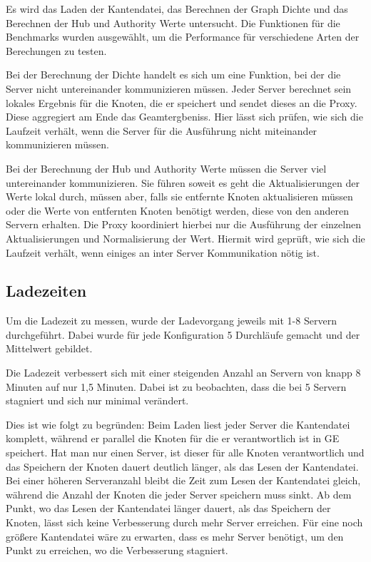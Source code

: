 Es wird das Laden der Kantendatei, das Berechnen der Graph Dichte und das Berechnen der Hub und Authority Werte untersucht. Die Funktionen für die Benchmarks wurden ausgewählt, um die Performance für verschiedene Arten der Berechungen zu testen.

Bei der Berechnung der Dichte handelt es sich um eine Funktion, bei der die Server nicht untereinander kommunizieren müssen. Jeder Server berechnet sein lokales Ergebnis für die Knoten, die er speichert und sendet dieses an die Proxy. 
Diese aggregiert am Ende das Geamtergbeniss. Hier lässt sich prüfen, wie sich die Laufzeit verhält, wenn die Server für die Ausführung nicht miteinander kommunizieren müssen.

Bei der Berechnung der Hub und Authority Werte müssen die Server viel untereinander kommunizieren. Sie führen soweit es geht die Aktualisierungen der Werte lokal durch, müssen aber, falls sie entfernte Knoten aktualisieren müssen oder die Werte von entfernten Knoten benötigt werden, diese von den anderen Servern erhalten.
Die Proxy koordiniert hierbei nur die Ausführung der einzelnen Aktualisierungen und Normalisierung der Wert. Hiermit wird geprüft, wie sich die Laufzeit verhält, wenn einiges an inter Server Kommunikation nötig ist.


\subsection{Ladezeiten}

Um die Ladezeit zu messen, wurde der Ladevorgang jeweils mit 1-8 Servern durchgeführt. Dabei wurde für jede Konfiguration 5 Durchläufe gemacht und der Mittelwert gebildet.

Die Ladezeit verbessert sich mit einer steigenden Anzahl an Servern von knapp 8 Minuten auf nur 1,5 Minuten. Dabei ist zu beobachten, dass die bei 5 Servern stagniert und sich nur minimal verändert.

Dies ist wie folgt zu begründen: Beim Laden liest jeder Server die Kantendatei komplett, während er parallel die Knoten für die er verantwortlich ist in GE speichert. Hat man nur einen Server, ist dieser für alle Knoten verantwortlich
und das Speichern der Knoten dauert deutlich länger, als das Lesen der Kantendatei. Bei einer höheren Serveranzahl bleibt die Zeit zum Lesen der Kantendatei gleich, während die Anzahl der Knoten die jeder Server speichern muss sinkt.
Ab dem Punkt, wo das Lesen der Kantendatei länger dauert, als das Speichern der Knoten, lässt sich keine Verbesserung durch mehr Server erreichen. Für eine noch größere Kantendatei wäre zu erwarten, dass es mehr Server benötigt, um den Punkt zu erreichen, wo die Verbesserung stagniert.

